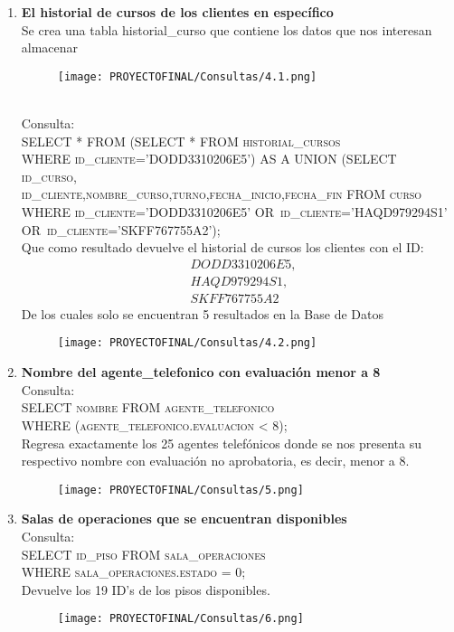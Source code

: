 \documentclass[12pt,letterpaper]{article}
\begin{document}
\begin{enumerate}
    
    \item \textbf{El historial de cursos de los clientes en específico}\\
    Se crea una tabla historial\_curso que contiene los datos que nos interesan almacenar
    \begin{figure}[h!]
      \centering
      \texttt{[image: PROYECTOFINAL/Consultas/4.1.png]}
  \end{figure}\\
  Consulta:\\ \textsc{ SELECT * FROM (SELECT * FROM historial\_cursos\\ WHERE id\_cliente='DODD3310206E5') AS A UNION
	 (SELECT id\_curso, \\id\_cliente,nombre\_curso,turno,fecha\_inicio,fecha\_fin FROM curso \\WHERE id\_cliente='DODD3310206E5' OR\ id\_cliente='HAQD979294S1' OR\ id\_cliente='SKFF767755A2');}\\
 Que como resultado devuelve el historial de cursos los clientes con el ID:
\begin{align*}
    &DODD3310206E5,\\&HAQD979294S1,\\&SKFF767755A2
\end{align*}
De los cuales solo se encuentran 5 resultados en la Base de Datos
\begin{figure}[h]
    \centering
    \texttt{[image: PROYECTOFINAL/Consultas/4.2.png]}
\end{figure}
\newpage
    \item  \textbf{Nombre del agente\_telefonico con evaluación menor a 8} \\
    Consulta:\\ \textsc{ SELECT nombre FROM agente\_telefonico\\ WHERE (agente\_telefonico.evaluacion < 8);}\\ Regresa exactamente los 25 agentes telefónicos donde se nos presenta su respectivo nombre con  evaluación no aprobatoria, es decir, menor a 8.

    \begin{figure}[h]
        \centering
        \texttt{[image: PROYECTOFINAL/Consultas/5.png]}
    \end{figure}

    
    \item \textbf{Salas de operaciones que se encuentran disponibles} \\
     Consulta:\\ \textsc{ SELECT id\_piso FROM sala\_operaciones\\WHERE sala\_operaciones.estado = 0;}\\Devuelve los 19 ID's de los pisos disponibles.
    \begin{figure}[h]
        \centering
        \texttt{[image: PROYECTOFINAL/Consultas/6.png]}
    \end{figure}


\end{enumerate}
\end{document}
